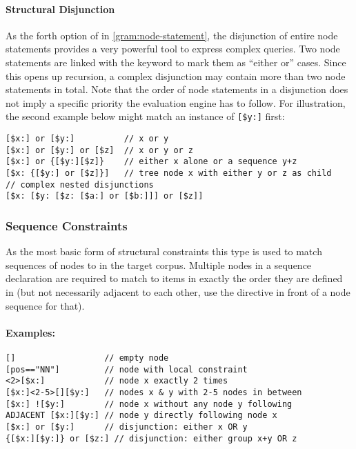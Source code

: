 \documentclass[11pt,a4paper]{article}
\begin{document}
\paragraph{Structural Disjunction}
\noindent As the forth option of  in \cref{gram:node-statement}, the disjunction of entire node statements provides a very powerful tool to express complex queries.
Two node statements are linked with the  keyword to mark them as ``either or'' cases.
Since this opens up recursion, a complex disjunction may contain more than two node statements in total.
Note that the order of node statements in a disjunction does not imply a specific priority the evaluation engine has to follow.
For illustration, the second example below might match an instance of \verb|[$y:]| first:
\begin{Verbatim}[samepage=true]
[$x:] or [$y:]          // x or y
[$x:] or [$y:] or [$z]  // x or y or z
[$x:] or {[$y:][$z]}    // either x alone or a sequence y+z
[$x: {[$y:] or [$z]}]   // tree node x with either y or z as child
// complex nested disjunctions
[$x: [$y: [$z: [$a:] or [$b:]]] or [$z]]
\end{Verbatim}

\subsubsection{Sequence Constraints}
\label{sec:sequence-constraints}

As the most basic form of structural constraints this type is used to match sequences of nodes to  in the target corpus.
Multiple nodes in a sequence declaration are required to match to items in exactly the order they are defined in (but not necessarily adjacent to each other, use the  directive in front of a node sequence for that).

\paragraph{Examples:}

\begin{Verbatim}[samepage=true]
[]                  // empty node
[pos=="NN"]         // node with local constraint
<2>[$x:]            // node x exactly 2 times       
[$x:]<2-5>[][$y:]   // nodes x & y with 2-5 nodes in between
[$x:] ![$y:]        // node x without any node y following
ADJACENT [$x:][$y:] // node y directly following node x
[$x:] or [$y:]      // disjunction: either x OR y
{[$x:][$y:]} or [$z:] // disjunction: either group x+y OR z
\end{Verbatim}
\end{document}
